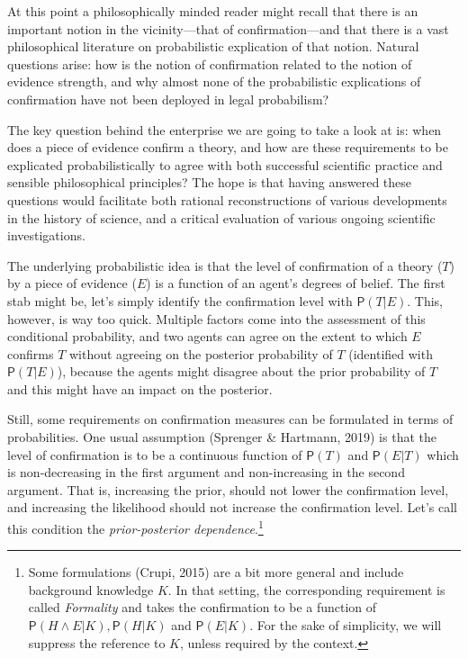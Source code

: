 \documentclass[
  10pt,
  dvipsnames,enabledeprecatedfontcommands]{scrartcl}
\newcommand{\et}{\wedge}
\newcommand{\pr}[1]{\mathsf{P}(#1)}
\begin{document}
At this point a philosophically minded reader might recall that there is
an important notion in the vicinity---that of confirmation---and that
there is a vast philosophical literature on probabilistic explication of
that notion. Natural questions arise: how is the notion of confirmation
related to the notion of evidence strength, and why almost none of the
probabilistic explications of confirmation have not been deployed in
legal probabilism?

The key question behind the enterprise we are going to take a look at
is: when does a piece of evidence confirm a theory, and how are these
requirements to be explicated probabilistically to agree with both
successful scientific practice and sensible philosophical principles?
The hope is that having answered these questions would facilitate both
rational reconstructions of various developments in the history of
science, and a critical evaluation of various ongoing scientific
investigations.

The underlying probabilistic idea is that the level of confirmation of a
theory (\(T\)) by a piece of evidence (\(E\)) is a function of an
agent's degrees of belief. The first stab might be, let's simply
identify the confirmation level with \(\pr{T \vert E}\). This, however,
is way too quick. Multiple factors come into the assessment of this
conditional probability, and two agents can agree on the extent to which
\(E\) confirms \(T\) without agreeing on the posterior probability of
\(T\) (identified with \(\pr{T \vert E}\)), because the agents might
disagree about the prior probability of \(T\) and this might have an
impact on the posterior.

Still, some requirements on confirmation measures can be formulated in
terms of probabilities. One usual assumption (Sprenger \& Hartmann,
2019) is that the level of confirmation is to be a continuous function
of \(\pr{T}\) and \(\pr{E\vert T}\) which is non-decreasing in the first
argument and non-increasing in the second argument. That is, increasing
the prior, should not lower the confirmation level, and increasing the
likelihood should not increase the confirmation level. Let's call this
condition the \emph{prior-posterior dependence}.\footnote{Some
  formulations (Crupi, 2015) are a bit more general and include
  background knowledge \(K\). In that setting, the corresponding
  requirement is called \emph{Formality} and takes the confirmation to
  be a function of \(\pr{H \et E \vert K}, \pr{H\vert K}\) and
  \(\pr{E\vert K}\). For the sake of simplicity, we will suppress the
  reference to \(K\), unless required by the context.}
\end{document}

